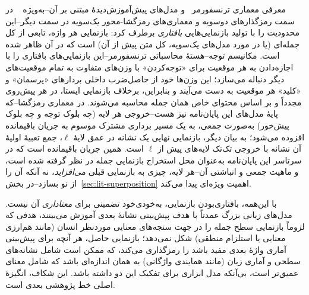 معرفی معماری ترنسفورمر~\cite{vaswani2017attention}
و مدل‌های پیش‌آموزش‌دیدهٔ مبتنی بر آن--به‌ویژه
~\cite{devlin2019bert}
در سمت رمزگذارهای دوسویه و معماری‌های رمزگشا-محور یک‌سویه در سمت دیگر--این محدودیت را با تولید بازنمایی‌هایی \emph{بافتاری}
برطرف کرد: بازنمایی هر واژه، تابعی از کل جمله‌ای (یا در مورد مدل‌های یک‌سویه، کل متن پیش از آن) است که در آن ظاهر شده است. مکانیسم توجه--هستهٔ محاسباتی ترنسفورمر--این بازنمایی‌های بافتاری را با اجازه‌دادن به هر موقعیت برای «توجه‌کردن» با وزن‌های متفاوت به تمام موقعیت‌های دیگر دنباله می‌سازد؛ این وزن‌ها خود از حاصل‌ضرب داخلی بردارهای «پرسمان» و «کلید» هر موقعیت به دست می‌آیند و بنابراین، برخلاف بازنمایی ایستا، در هر پیش‌روی مجدداً و بر اساس محتوای خاص همان جمله محاسبه می‌شوند. در معماری رمزگشا--که پایهٔ مدل‌های این پایان‌نامه نیز هست--خروجی هر لایه (چه بلوک توجه و چه بلوک پیش‌خور) به‌صورت جمعی، به یک مسیر برداری مشترک موسوم به جریان باقیمانده
افزوده می‌شود؛ به بیان دیگر، بازنمایی نهایی یک نشانه در عمق لایهٔ
$\ell$، جمع تعبیهٔ اولیهٔ آن نشانه با خروجی تک‌تک لایه‌های پیش از
$\ell$
است. همین جریان باقیمانده است که در سرتاسر این پایان‌نامه به‌عنوان محل استخراج بازنمایی جمله در نظر گرفته شده است، و ماهیت جمعی و انباشتی آن--هر لایه، چیزی به بازنمایی قبلی \emph{می‌افزاید}، نه آنکه آن را از نو بسازد--در بخش~\ref{sec:lit-superposition} اهمیت ویژه‌ای پیدا می‌کند.

با این‌همه، بافتاری‌بودن بازنمایی، به‌خودی‌خود تضمینی برای \emph{معناداری} آن نیست. مدل‌های زبانی بزرگ عمدتاً با هدف پیش‌بینی نشانهٔ بعدی آموزش می‌بینند، هدفی که لزوماً بازنمایی سطح جمله را در جهت سنجه‌های معنایی موردنظر انسان (مانند هم‌ارزی معنایی یا استلزام منطقی) شکل نمی‌دهد؛ بازنمایی حاصل، هر آنچه برای پیش‌بینی آماری واژهٔ بعدی مفید باشد را رمزگذاری می‌کند، که ممکن است شامل نشانه‌های سطحی و آماری زبان (مانند همایندی واژگانی) به همان اندازه‌ای باشد که شامل معنای عمیق‌تر است، بی‌آنکه مدل ابزاری برای تفکیک این دو داشته باشد. این شکاف، انگیزهٔ اصلی خط پژوهشی بعدی است.

